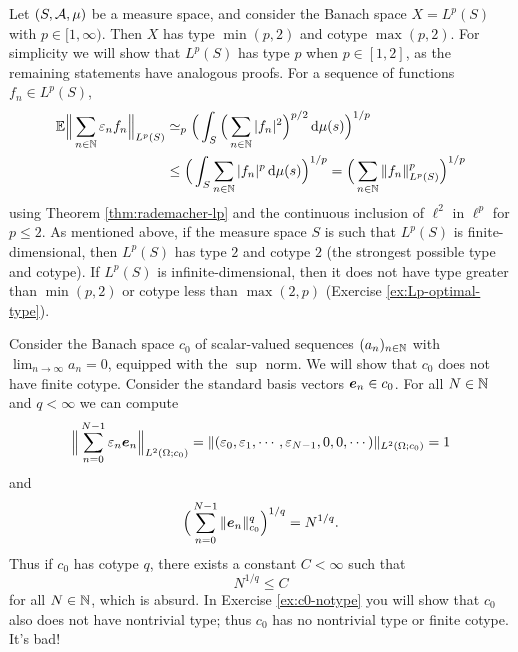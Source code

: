 \begin{example}
  Let $(S,\mathcal{A},\mu)$ be a measure space, and consider the Banach space $X = L^p(S)$ with $p \in [1,\infty)$.
  Then $X$ has type $\min(p,2)$ and cotype $\max(p,2)$.
  For simplicity we will show that $L^p(S)$ has type $p$ when $p \in [1,2]$, as the remaining statements have analogous proofs.
  For a sequence of functions $f_{n} \in L^p(S)$,
  \begin{equation*}
    \begin{aligned}
      \mathbb{E} \Big\| \sum_{n \in \mathbb{N}} \varepsilon_{n} f_{n} \Big\|_{L^p(S)}
      &\simeq_{p} \Big( \int_{S} \Big( \sum_{n \in \mathbb{N}} |f_{n}|^{2} \Big)^{p/2} \, \mathrm{d}\mu(s) \Big)^{1/p} \\
      &\leq \Big( \int_{S} \sum_{n \in \mathbb{N}} |f_{n}|^{p} \, \mathrm{d}\mu(s) \Big)^{1/p}
      = \Big( \sum_{n \in \mathbb{N}} \|f_{n}\|_{L^p(S)}^{p} \Big)^{1/p}
    \end{aligned}
  \end{equation*}
  using Theorem \ref{thm:rademacher-lp} and the continuous inclusion of $\ell^{2}$ in $\ell^{p}$ for $p \leq 2$.
  As mentioned above, if the measure space $S$ is such that $L^p(S)$ is finite-dimensional, then $L^p(S)$ has type $2$ and cotype $2$ (the strongest possible type and cotype).
  If $L^p(S)$ is infinite-dimensional, then it does not have type greater than $\min(p,2)$ or cotype less than $\max(2,p)$ (Exercise \ref{ex:Lp-optimal-type}). 
\end{example}

\begin{example}
  Consider the Banach space $c_{0}$ of scalar-valued sequences $(a_{n})_{n \in \mathbb{N}}$ with $\lim_{n \to \infty} a_{n} = 0$, equipped with the $\sup$ norm.
  We will show that $c_{0}$ does not have finite cotype.
  Consider the standard basis vectors $\bm{e}_{n} \in c_{0}$.
  For all $N \in \mathbb{N}$ and $q < \infty$ we can compute
  \begin{equation*}
    \Big\| \sum_{n = 0}^{N-1} \varepsilon_{n} \bm{e}_{n} \Big\|_{L^2(\Omega;c_0)}
    = \| (\varepsilon_{0}, \varepsilon_{1}, \cdots, \varepsilon_{N-1}, 0, 0, \cdots) \|_{L^2(\Omega;c_{0})} = 1
  \end{equation*}
  and
  \begin{equation*}
    \Big( \sum_{n=0}^{N-1} \|\bm{e}_{n}\|_{c_0}^{q} \Big)^{1/q} = N^{1/q}.
  \end{equation*}
  Thus if $c_{0}$ has cotype $q$, there exists a constant $C < \infty$ such that
  \begin{equation*}
    N^{1/q} \leq C
  \end{equation*}
  for all $N \in \mathbb{N}$, which is absurd.
  In Exercise \ref{ex:c0-notype} you will show that $c_{0}$ also does not have nontrivial type; thus $c_{0}$ has no nontrivial type or finite cotype. It's bad!
  
\end{example}

